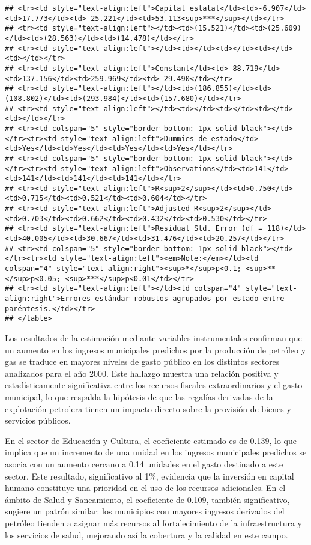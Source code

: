 \documentclass[
]{article}
\begin{document}
\begin{verbatim}
## <tr><td style="text-align:left">Capital estatal</td><td>-6.907</td><td>17.773</td><td>-25.221</td><td>53.113<sup>***</sup></td></tr>
## <tr><td style="text-align:left"></td><td>(15.521)</td><td>(25.609)</td><td>(28.563)</td><td>(14.478)</td></tr>
## <tr><td style="text-align:left"></td><td></td><td></td><td></td><td></td></tr>
## <tr><td style="text-align:left">Constant</td><td>-88.719</td><td>137.156</td><td>259.969</td><td>-29.490</td></tr>
## <tr><td style="text-align:left"></td><td>(186.855)</td><td>(108.802)</td><td>(293.984)</td><td>(157.680)</td></tr>
## <tr><td style="text-align:left"></td><td></td><td></td><td></td><td></td></tr>
## <tr><td colspan="5" style="border-bottom: 1px solid black"></td></tr><tr><td style="text-align:left">Dummies de estado</td><td>Yes</td><td>Yes</td><td>Yes</td><td>Yes</td></tr>
## <tr><td colspan="5" style="border-bottom: 1px solid black"></td></tr><tr><td style="text-align:left">Observations</td><td>141</td><td>141</td><td>141</td><td>141</td></tr>
## <tr><td style="text-align:left">R<sup>2</sup></td><td>0.750</td><td>0.715</td><td>0.521</td><td>0.604</td></tr>
## <tr><td style="text-align:left">Adjusted R<sup>2</sup></td><td>0.703</td><td>0.662</td><td>0.432</td><td>0.530</td></tr>
## <tr><td style="text-align:left">Residual Std. Error (df = 118)</td><td>40.005</td><td>30.667</td><td>31.476</td><td>20.257</td></tr>
## <tr><td colspan="5" style="border-bottom: 1px solid black"></td></tr><tr><td style="text-align:left"><em>Note:</em></td><td colspan="4" style="text-align:right"><sup>*</sup>p<0.1; <sup>**</sup>p<0.05; <sup>***</sup>p<0.01</td></tr>
## <tr><td style="text-align:left"></td><td colspan="4" style="text-align:right">Errores estándar robustos agrupados por estado entre paréntesis.</td></tr>
## </table>
\end{verbatim}

Los resultados de la estimación mediante variables instrumentales
confirman que un aumento en los ingresos municipales predichos por la
producción de petróleo y gas se traduce en mayores niveles de gasto
público en los distintos sectores analizados para el año 2000. Este
hallazgo muestra una relación positiva y estadísticamente significativa
entre los recursos fiscales extraordinarios y el gasto municipal, lo que
respalda la hipótesis de que las regalías derivadas de la explotación
petrolera tienen un impacto directo sobre la provisión de bienes y
servicios públicos.

En el sector de Educación y Cultura, el coeficiente estimado es de
0.139, lo que implica que un incremento de una unidad en los ingresos
municipales predichos se asocia con un aumento cercano a 0.14 unidades
en el gasto destinado a este sector. Este resultado, significativo al
1\%, evidencia que la inversión en capital humano constituye una
prioridad en el uso de los recursos adicionales. En el ámbito de Salud y
Saneamiento, el coeficiente de 0.109, también significativo, sugiere un
patrón similar: los municipios con mayores ingresos derivados del
petróleo tienden a asignar más recursos al fortalecimiento de la
infraestructura y los servicios de salud, mejorando así la cobertura y
la calidad en este campo.
\end{document}
